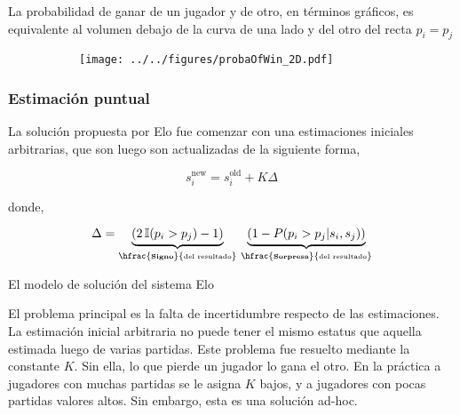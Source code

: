 \documentclass[a4paper,10pt]{article}
\begin{document}
La probabilidad de ganar de un jugador y de otro, en t\'erminos gr\'aficos, es equivalente al volumen debajo de la curva de una lado y del otro del recta $p_i=p_j$

\begin{figure}[H]     
     \centering
     \begin{subfigure}[b]{0.45\textwidth}
       \texttt{[image: ../../figures/probaOfWin\_2D.pdf]} 
     \end{subfigure}
\end{figure}

\subsubsection{Estimaci\'on puntual}

La soluci\'on propuesta por Elo fue comenzar con una estimaciones iniciales arbitrarias, que son luego son actualizadas de la siguiente forma, 

\begin{equation*}
s_i^{\text{new}} = s_i^{\text{old}} + K \Delta
\end{equation*}

donde,

\begin{equation*}
\Delta = \underbrace{(2\,\mathbb{I}(p_i>p_j)-1)}_{\hfrac{\textbf{\tiny Signo}} {\text{\tiny del resultado}}} \, \underbrace{(1 - P(p_i>p_j|s_i,s_j))}_{\hfrac{\textbf{\tiny Sorpresa}}{\text{\tiny del resultado}}}
\end{equation*}

El modelo de soluci\'on del sistema Elo 


\begin{figure}[H]
\centering
{} 
\end{figure}

El problema principal es la falta de incertidumbre respecto de las estimaciones.
La estimaci\'on inicial arbitraria no puede tener el mismo estatus que aquella estimada luego de varias partidas.
Este problema fue resuelto mediante la constante $K$.
Sin ella, lo que pierde un jugador lo gana el otro.
En la pr\'actica a jugadores con muchas partidas se le asigna $K$ bajos, y a jugadores con pocas partidas valores altos.
Sin embargo, esta es una soluci\'on ad-hoc.
\end{document}
